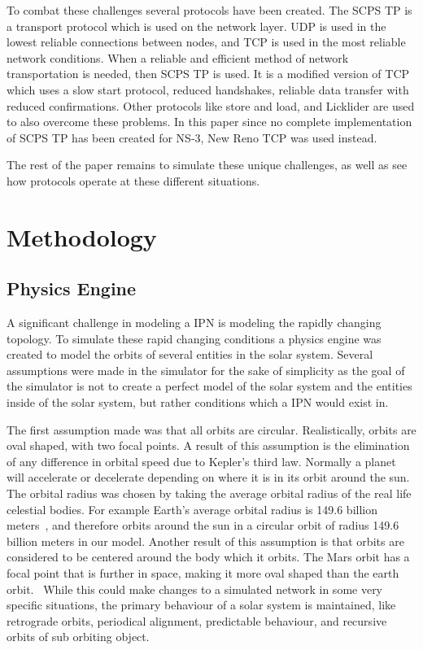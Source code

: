 \documentclass[a4paper,12pt]{article}
\begin{document}
To combat these challenges several protocols have been created. The SCPS TP is a
transport protocol which is used on the network layer. UDP is used in the lowest
reliable connections between nodes, and TCP is used in the most reliable network
conditions. When a reliable and efficient method of network transportation is
needed, then SCPS TP is used. It is a modified version of TCP which uses a slow
start protocol, reduced handshakes, reliable data transfer with reduced
confirmations. Other protocols like store and load, and Licklider are used to
also overcome these problems. In this paper since no complete implementation of 
SCPS TP has been created for NS-3, New Reno TCP was used instead.

The rest of the paper remains to simulate these unique challenges, as well as
see how protocols operate at these different situations.

\section{Methodology}

\subsection{Physics Engine}

A significant challenge in modeling a IPN is modeling the rapidly changing topology. To
simulate these rapid changing conditions a physics engine was created to model
the orbits of several entities in the solar system. Several assumptions were
made in the simulator for the sake of simplicity as the goal of the simulator is
not to create a perfect model of the solar system and the entities inside of the
solar system, but rather conditions which a IPN would exist in.

The first assumption made was that all orbits are circular. Realistically,
orbits are oval shaped, with two focal points. A result of this assumption
is the elimination of any difference in orbital speed due to Kepler's third law.
Normally a planet will accelerate or decelerate depending on where it is in 
its orbit around the sun. 
The orbital radius was chosen by taking the average orbital radius of the real
life celestial bodies. For example Earth's average orbital radius is 149.6
billion meters~\cite{nasa_earth}, and therefore orbits around the sun in a
circular orbit of radius 149.6 billion meters in our model. Another result of this assumption
is that orbits are considered to be centered around the body which it orbits.
The Mars orbit has a focal point that is further in space, making it more oval
shaped than the earth orbit.~\cite{nasa_mars} While this could make changes to a
simulated network in some very specific situations, the primary behaviour of a
solar system is maintained, like retrograde orbits, periodical alignment,
predictable behaviour, and recursive orbits of sub orbiting object.
\end{document}
